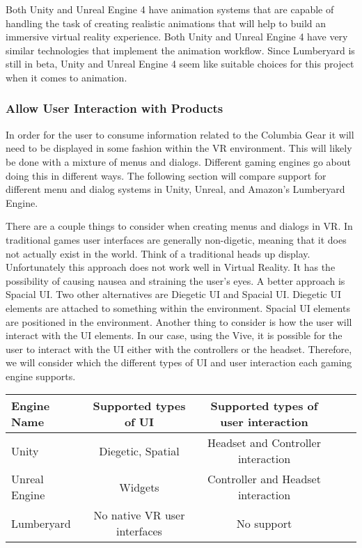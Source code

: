 \documentclass[10pt,journal,compsoc,onecolumn, draftclsnofoot]{IEEEtran}
\begin{document}
Both Unity and Unreal Engine 4 have animation systems that are capable of handling the task of creating realistic animations that will help to build an immersive virtual reality experience. Both Unity and Unreal Engine 4 have very similar technologies that implement the animation workflow. Since Lumberyard is still in beta, Unity and Unreal Engine 4 seem like suitable choices for this project when it comes to animation.

\subsubsection{Allow User Interaction with Products}
In order for the user to consume information related to the Columbia Gear it will need to be displayed in some fashion within the VR environment.
This will likely be done with a mixture of menus and dialogs.
Different gaming engines go about doing this in different ways.
The following section will compare support for different menu and dialog systems in Unity, Unreal, and Amazon's Lumberyard Engine.

There are a couple things to consider when creating menus and dialogs in VR.
In traditional games user interfaces are generally non-digetic, meaning that it does not actually exist in the world.
Think of a traditional heads up display.
Unfortunately this approach does not work well in Virtual Reality.
It has the possibility of causing nausea and straining the user's eyes.
A better approach is Spacial UI.
Two other alternatives are Diegetic UI and Spacial UI.
Diegetic UI elements are attached to something within the environment.
Spacial UI elements are positioned in the environment.
Another thing to consider is how the user will interact with the UI elements.
In our case, using the Vive, it is possible for the user to interact with the UI either with the controllers or the headset.
Therefore, we will consider which the different types of UI and user interaction each gaming engine supports.

\vspace{2mm}
\begin{table}[h!]
\centering
  \begin{tabular}{ | l || c | c | c | c |  }
  \hline
  Engine Name & Supported types of UI & Supported types of user interaction \\
  \hline
  Unity & Diegetic, Spatial &  Headset and Controller interaction\\ \hline
  Unreal Engine & Widgets & Controller and Headset interaction\\ \hline
  Lumberyard & No native VR user interfaces & No support\\ \hline
  \hline
  \end{tabular}
\end{table}
\vspace{2mm}
\end{document}
